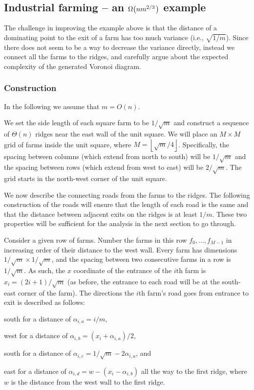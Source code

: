 \documentclass[12pt]{article}
\newcommand{\ts}{\hspace{0.6pt}}\renewcommand{\th}{\si{th}\xspace}
\providecommand{\si}[1]{#1}
\newcommand{\pth}[2][\!]{#1\left({#2}\right)}
\newcommand{\west}{west\xspace}
\newcommand{\east}{east\xspace}
\newcommand{\south}{south\xspace}
\newcommand{\southeast}{south-east\xspace}
\newcommand{\northwest}{north-west\xspace}
\newcommand{\floor}[1]{\left\lfloor {#1} \right\rfloor}
\begin{document}
\subsection{Industrial farming -- an $\Omega\pth{n m^{2/3}\ts \ts }$ example}


The challenge in improving the example above is that the distance of a
dominating point to the exit of a farm has too much variance (i.e.,
$\sqrt{1/m}$). Since there does not seem to be a way to decrease the variance
directly, instead we connect all the farms to the ridges, and carefully argue
about the expected complexity of the generated Voronoi diagram.

\subsubsection{Construction}

In the following we assume that $m = O(n)$.  

We set the side length of each square farm to be $1/ \sqrt{m}$ and
construct a sequence of $\Theta\pth{n}$ ridges near the \east wall of
the unit square.  We will place an $M \times M$ grid of farms inside
the unit square, where $M = \floor{\sqrt{m}/4}$.  Specifically, the
spacing between columns (which extend from north to south) will be 
$1/\sqrt{m}$ and the spacing between rows (which extend from west to 
east) will be $2/\sqrt{m}$.
The grid starts in the \northwest corner of the unit square.

We now describe the connecting roads from the farms to the ridges.
The following construction of the roads will ensure that the length of
each road is the same and that the distance between adjacent exits on
the ridges is at least $1/m$.  These two properties will be sufficient
for the analysis in the next section to go through.


Consider a given row of farms.  Number the farms in this row $f_0,
\dots, f_{M-1}$ in increasing order of their distance to the \west
wall. Every farm has dimensions $1/\sqrt{m} \times 1/\sqrt{m}$, and the spacing
between two consecutive farms in a row is $1/\sqrt{m}$.  As such,
the $x$ coordinate of the entrance of the $i$\th farm is $x_i =
(2i+1)/\sqrt{m}$ (as before, the entrance to each road will be at the
\southeast corner of the farm).  The directions the $i$\th farm's
road goes from entrance to exit is described as follows:
\begin{compactenum}[\qquad(a)]
    \item \south for a distance of $\alpha_{i,a} = i/m$,
    \item \west for a distance of $\alpha_{i,b} = (x_i + \alpha_{i,a})/2$,
    \item \south for a distance of $\alpha_{i,c} = 1/\sqrt{m}-2\alpha_{i,a}$, and
    \item \east for a distance of $\alpha_{i,d}= w - (x_i-\alpha_{i,b})$ 
    all the way to the first ridge, where $w$ is the distance from the
    \west wall to the first ridge.
\end{compactenum}
\end{document}
